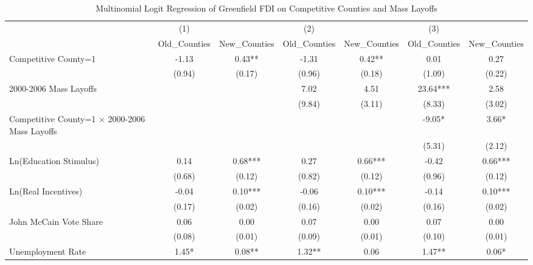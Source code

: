 \begin{table}[!htbp]\centering
\def\sym#1{\ifmmode^{#1}\else\(^{#1}\)\fi}
\caption{Multinomial Logit Regression of Greenfield FDI on Competitive Counties and Mass Layoffs}
\begin{tabular}{l*{6}{c}}
\hline\hline
                    &         (1)   &               &         (2)   &               &         (3)   &               \\
                    &Old_Counties   &New_Counties   &Old_Counties   &New_Counties   &Old_Counties   &New_Counties   \\
\hline
Competitive County=1&       -1.13   &        0.43** &       -1.31   &        0.42** &        0.01   &        0.27   \\
                    &      (0.94)   &      (0.17)   &      (0.96)   &      (0.18)   &      (1.09)   &      (0.22)   \\
2000-2006 Mass Layoffs&               &               &        7.02   &        4.51   &       23.64***&        2.58   \\
                    &               &               &      (9.84)   &      (3.11)   &      (8.33)   &      (3.02)   \\
Competitive County=1 $\times$ 2000-2006 Mass Layoffs&               &               &               &               &       -9.05*  &        3.66*  \\
                    &               &               &               &               &      (5.31)   &      (2.12)   \\
Ln(Education Stimulus)&        0.14   &        0.68***&        0.27   &        0.66***&       -0.42   &        0.66***\\
                    &      (0.68)   &      (0.12)   &      (0.82)   &      (0.12)   &      (0.96)   &      (0.12)   \\
Ln(Real Incentives) &       -0.04   &        0.10***&       -0.06   &        0.10***&       -0.14   &        0.10***\\
                    &      (0.17)   &      (0.02)   &      (0.16)   &      (0.02)   &      (0.16)   &      (0.02)   \\
John McCain Vote Share&        0.06   &        0.00   &        0.07   &        0.00   &        0.07   &        0.00   \\
                    &      (0.08)   &      (0.01)   &      (0.09)   &      (0.01)   &      (0.10)   &      (0.01)   \\
Unemployment Rate   &        1.45*  &        0.08** &        1.32** &        0.06   &        1.47** &        0.06*  \\

\end{tabular}
\end{table}
